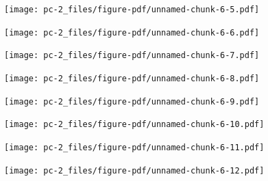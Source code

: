 \documentclass[
  letterpaper,
  DIV=11,
  numbers=noendperiod]{scrreprt}
\begin{document}
\begin{figure}[H]

{\centering \texttt{[image: pc-2\_files/figure-pdf/unnamed-chunk-6-5.pdf]}

}

\end{figure}

\begin{figure}[H]

{\centering \texttt{[image: pc-2\_files/figure-pdf/unnamed-chunk-6-6.pdf]}

}

\end{figure}

\begin{figure}[H]

{\centering \texttt{[image: pc-2\_files/figure-pdf/unnamed-chunk-6-7.pdf]}

}

\end{figure}

\begin{figure}[H]

{\centering \texttt{[image: pc-2\_files/figure-pdf/unnamed-chunk-6-8.pdf]}

}

\end{figure}

\begin{figure}[H]

{\centering \texttt{[image: pc-2\_files/figure-pdf/unnamed-chunk-6-9.pdf]}

}

\end{figure}

\begin{figure}[H]

{\centering \texttt{[image: pc-2\_files/figure-pdf/unnamed-chunk-6-10.pdf]}

}

\end{figure}

\begin{figure}[H]

{\centering \texttt{[image: pc-2\_files/figure-pdf/unnamed-chunk-6-11.pdf]}

}

\end{figure}

\begin{figure}[H]

{\centering \texttt{[image: pc-2\_files/figure-pdf/unnamed-chunk-6-12.pdf]}

}

\end{figure}
\end{document}
